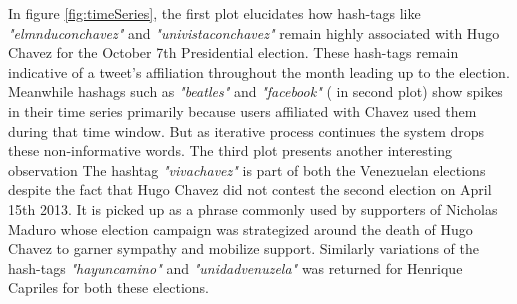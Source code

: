 In figure \ref{fig:timeSeries}, the first plot elucidates how hash-tags like \emph{"elmnduconchavez"} and \emph{"univistaconchavez"} remain highly associated with Hugo Chavez for the October 7th Presidential election. 
These hash-tags remain indicative of a tweet's affiliation throughout the month leading up to the election.
Meanwhile hashags such as \emph{"beatles"} and \emph{"facebook"} ( in second plot) show spikes in their time series primarily because users affiliated with Chavez used them during that time window. 
But as iterative process continues the system drops these non-informative words.
The third plot presents another interesting observation 
The hashtag \emph{"vivachavez"} is part of both the Venezuelan elections despite the fact that Hugo Chavez did not contest the second election on April 15th 2013. 
It is picked up as a phrase commonly used by supporters of Nicholas Maduro whose election campaign was strategized around the death of Hugo Chavez to garner sympathy and mobilize support.
Similarly variations of the hash-tags \emph{"hayuncamino"} and \emph{"unidadvenuzela"} was returned for Henrique Capriles for both these elections.
